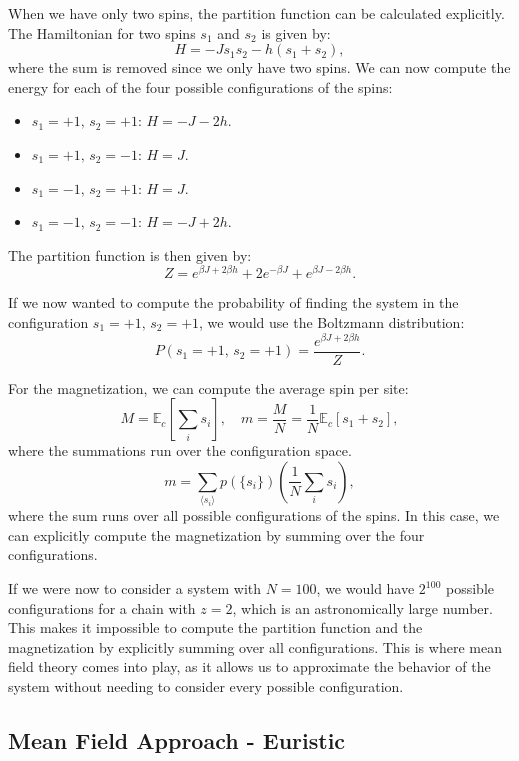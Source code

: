 \begin{example}
    When we have only two spins, the partition function can be calculated explicitly. The Hamiltonian for two spins \(s_1\) and \(s_2\) is given by:
    \[
        H = - J s_1 s_2 - h (s_1 + s_2),
    \]
    where the sum is removed since we only have two spins. We can now compute the energy for each of the four possible configurations of the spins:
    \begin{itemize}
        \item \(s_1 = +1,\, s_2 = +1\): \(H = - J - 2h\).
        \item \(s_1 = +1,\, s_2 = -1\): \(H = J\).
        \item \(s_1 = -1,\, s_2 = +1\): \(H = J\).
        \item \(s_1 = -1,\, s_2 = -1\): \(H = - J + 2h\).
    \end{itemize}
    The partition function is then given by:
    \[
        Z = e^{\beta J + 2\beta h} + 2 e^{-\beta J} + e^{\beta J - 2\beta h}.
    \]

    If we now wanted to compute the probability of finding the system in the configuration \(s_1 = +1,\, s_2 = +1\), we would use the Boltzmann distribution:
    \[
        P(s_1 = +1,\, s_2 = +1) = \frac{e^{\beta J + 2\beta h}}{Z}.
    \]

    For the magnetization, we can compute the average spin per site:
    \[
        M = \mathbb{E}_c[\sum_{i} s_i], \quad m = \frac{M}{N} = \frac{1}{N} \mathbb{E}_c[s_1 + s_2],
    \]
    where the summations run over the configuration space.
    \[
        m = \sum_{\langle s_i \rangle} p(\{s_i\}) \left( \frac{1}{N} \sum_{i} s_i \right),
    \]
    where the sum runs over all possible configurations of the spins. In this case, we can explicitly compute the magnetization by summing over the four configurations.
\end{example}

If we were now to consider a system with \(N=100\), we would have \(2^{100}\) possible configurations for a chain with \(z=2\), which is an astronomically large number. This makes it impossible to compute the partition function and the magnetization by explicitly summing over all configurations. This is where mean field theory comes into play, as it allows us to approximate the behavior of the system without needing to consider every possible configuration.

\subsection{Mean Field Approach - Euristic}

